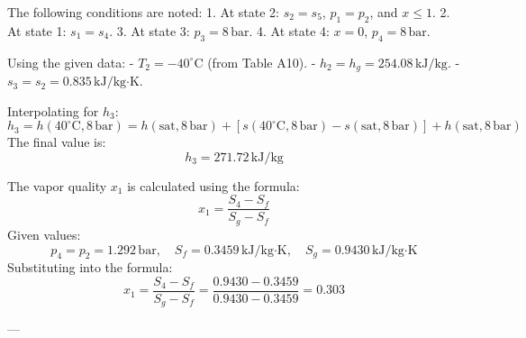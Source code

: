 The following conditions are noted:  
1. At state 2: \( s_2 = s_5 \), \( p_1 = p_2 \), and \( x \leq 1 \).  
2. At state 1: \( s_1 = s_4 \).  
3. At state 3: \( p_3 = 8 \, \text{bar} \).  
4. At state 4: \( x = 0 \), \( p_4 = 8 \, \text{bar} \).  

Using the given data:  
- \( T_2 = -40^\circ\text{C} \) (from Table A10).  
- \( h_2 = h_g = 254.08 \, \text{kJ/kg} \).  
- \( s_3 = s_2 = 0.835 \, \text{kJ/kg·K} \).  

Interpolating for \( h_3 \):  
\[
h_3 = h(40^\circ\text{C}, 8 \, \text{bar}) = h(\text{sat}, 8 \, \text{bar}) + \left[ s(40^\circ\text{C}, 8 \, \text{bar}) - s(\text{sat}, 8 \, \text{bar}) \right] + h(\text{sat}, 8 \, \text{bar})
\]
The final value is:  
\[
h_3 = 271.72 \, \text{kJ/kg}
\]

The vapor quality \( x_1 \) is calculated using the formula:  
\[
x_1 = \frac{S_4 - S_f}{S_g - S_f}
\]  
Given values:  
\[
p_4 = p_2 = 1.292 \, \text{bar}, \quad S_f = 0.3459 \, \text{kJ/kg·K}, \quad S_g = 0.9430 \, \text{kJ/kg·K}
\]  
Substituting into the formula:  
\[
x_1 = \frac{S_4 - S_f}{S_g - S_f} = \frac{0.9430 - 0.3459}{0.9430 - 0.3459} = 0.303
\]  

---
